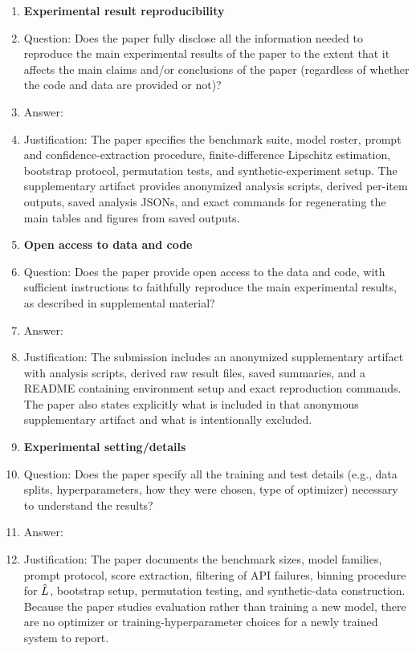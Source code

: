\begin{enumerate}
\item {\bf Experimental result reproducibility}
    \item[] Question: Does the paper fully disclose all the information needed to reproduce the main experimental results of the paper to the extent that it affects the main claims and/or conclusions of the paper (regardless of whether the code and data are provided or not)?
    \item[] Answer: \answerYes{}
    \item[] Justification: The paper specifies the benchmark suite, model roster, prompt and confidence-extraction procedure, finite-difference Lipschitz estimation, bootstrap protocol, permutation tests, and synthetic-experiment setup. The supplementary artifact provides anonymized analysis scripts, derived per-item outputs, saved analysis JSONs, and exact commands for regenerating the main tables and figures from saved outputs.

\item {\bf Open access to data and code}
    \item[] Question: Does the paper provide open access to the data and code, with sufficient instructions to faithfully reproduce the main experimental results, as described in supplemental material?
    \item[] Answer: \answerYes{}
    \item[] Justification: The submission includes an anonymized supplementary artifact with analysis scripts, derived raw result files, saved summaries, and a README containing environment setup and exact reproduction commands. The paper also states explicitly what is included in that anonymous supplementary artifact and what is intentionally excluded.

\item {\bf Experimental setting/details}
    \item[] Question: Does the paper specify all the training and test details (e.g., data splits, hyperparameters, how they were chosen, type of optimizer) necessary to understand the results?
    \item[] Answer: \answerYes{}
    \item[] Justification: The paper documents the benchmark sizes, model families, prompt protocol, score extraction, filtering of API failures, binning procedure for $\hat{L}$, bootstrap setup, permutation testing, and synthetic-data construction. Because the paper studies evaluation rather than training a new model, there are no optimizer or training-hyperparameter choices for a newly trained system to report.


\end{enumerate}
